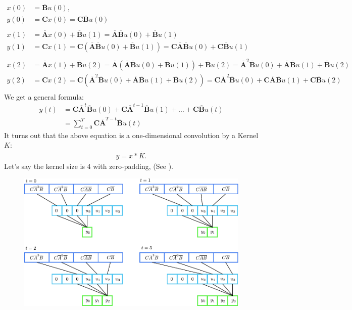 \begin{align*}
	x(0) &= \overline{\mathbf{B}}u(0),\\
	y(0) &= \mathbf{C}x(0) = \mathbf{C}\overline{\mathbf{B}}u(0)\\
		 &\\
	x(1) &= \overline{\mathbf{A}}x(0)+\overline{\mathbf{B}}u(1)=\overline{\mathbf{A}}\overline{\mathbf{B}}u(0)+\overline{\mathbf{B}}u(1)\\
	y(1) &= \mathbf{C}x(1) = \mathbf{C}(\overline{\mathbf{A}}\overline{\mathbf{B}}u(0)+\overline{\mathbf{B}}u(1)) = \mathbf{C}\overline{\mathbf{A}}\overline{\mathbf{B}}u(0)+\mathbf{C}\overline{\mathbf{B}}u(1)\\
		 &\\
	x(2) &= \overline{\mathbf{A}}x(1)+\overline{\mathbf{B}}u(2)=\overline{\mathbf{A}}(\overline{\mathbf{A}}\overline{\mathbf{B}}u(0)+\overline{\mathbf{B}}u(1))+\overline{\mathbf{B}}u(2)=\overline{\mathbf{A}}^2\overline{\mathbf{B}}u(0)+\overline{\mathbf{A}}\overline{\mathbf{B}}u(1)+\overline{\mathbf{B}}u(2)\\
	y(2) &= \mathbf{C}x(2)=\mathbf{C}(\overline{\mathbf{A}}^2\overline{\mathbf{B}}u(0)+\overline{\mathbf{A}}\overline{\mathbf{B}}u(1)+\overline{\mathbf{B}}u(2))=\mathbf{C}\overline{\mathbf{A}}^2\overline{\mathbf{B}}u(0)+\mathbf{C}\overline{\mathbf{A}}\overline{\mathbf{B}}u(1)+\mathbf{C}\overline{\mathbf{B}}u(2)\\
\end{align*}
We get a general formula:
\begin{align*}
	y(t) &= \mathbf{C}\overline{\mathbf{A}}^t\overline{\mathbf{B}}u(0)+\mathbf{C}\overline{\mathbf{A}}^{t-1}\overline{\mathbf{B}}u(1)+\dots+\mathbf{C}\overline{\mathbf{B}}u(t)\\
		 &= \sum_{t=0}^T \mathbf{C}\overline{\mathbf{A}}^{T-t}\overline{\mathbf{B}}u(t)
\end{align*}
It turns out that the above equation is a one-dimensional convolution by a Kernel $K$:
\begin{align*}
	y = x*\overline{K}.
\end{align*}
Let's say the kernel size is 4 with zero-padding,  (See ).

\begin{figure}[h]
	\centering
	\includegraphics[scale=0.95]{./images/state_space/mamba_conv.pdf}
	\caption{}
	\label{fig:mamba_conv}
\end{figure}


